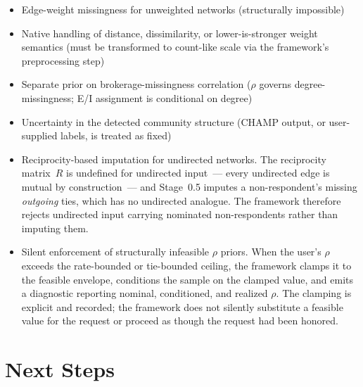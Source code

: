 \documentclass[11pt]{article}
\newcommand{\Rmat}{R}
\begin{document}
\begin{itemize}[leftmargin=*, itemsep=2pt]
\item Edge-weight missingness for unweighted networks (structurally impossible)
\item Native handling of distance, dissimilarity, or lower-is-stronger weight semantics (must be transformed to count-like scale via the framework's preprocessing step)
\item Separate prior on brokerage-missingness correlation ($\rho$ governs degree-missingness; E/I assignment is conditional on degree)
\item Uncertainty in the detected community structure (CHAMP output, or user-supplied labels, is treated as fixed)
\item Reciprocity-based imputation for undirected networks. The reciprocity matrix~$\Rmat$ is undefined for undirected input~--- every undirected edge is mutual by construction~--- and Stage~0.5 imputes a non-respondent's missing \emph{outgoing} ties, which has no undirected analogue. The framework therefore rejects undirected input carrying nominated non-respondents rather than imputing them.
\item Silent enforcement of structurally infeasible $\rho$ priors. When the user's $\rho$ exceeds the rate-bounded or tie-bounded ceiling, the framework clamps it to the feasible envelope, conditions the sample on the clamped value, and emits a diagnostic reporting nominal, conditioned, and realized $\rho$. The clamping is explicit and recorded; the framework does not silently substitute a feasible value for the request or proceed as though the request had been honored.
\end{itemize}

\section{Next Steps}
\end{document}
